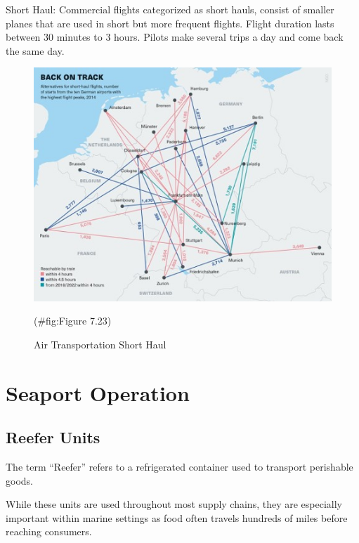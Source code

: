 \documentclass[
]{book}
\begin{document}
Short Haul:
Commercial flights categorized as short hauls, consist of smaller planes that are used in short but more frequent flights.
Flight duration lasts between 30 minutes to 3 hours.
Pilots make several trips a day and come back the same day.

\begin{figure}

{\centering \includegraphics{./Images/supplychain/Air Transportation Short Haul} 

}

\caption{Air Transportation Short Haul}(\#fig:Figure 7.23)
\end{figure}

\hypertarget{seaport}{%
\chapter{Seaport Operation}\label{seaport}}

\hypertarget{seaport-reefer}{%
\section{Reefer Units}\label{seaport-reefer}}

The term ``Reefer'' refers to a refrigerated container used to transport perishable goods.

While these units are used throughout most supply chains, they are especially important within marine settings as food often travels hundreds of miles before reaching consumers.
\end{document}
